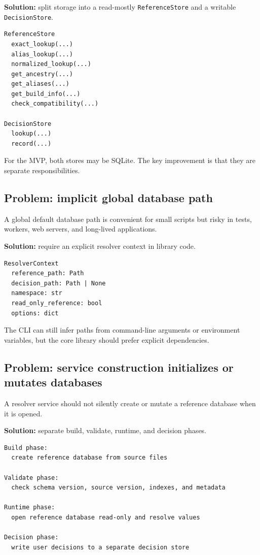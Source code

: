 \documentclass[11pt,a4paper]{article}
\newcommand{\code}[1]{\texttt{#1}}
\begin{document}
\textbf{Solution:} split storage into a read-mostly \code{ReferenceStore} and a writable \code{DecisionStore}.

\begin{Verbatim}[fontsize=\small]
ReferenceStore
  exact_lookup(...)
  alias_lookup(...)
  normalized_lookup(...)
  get_ancestry(...)
  get_aliases(...)
  get_build_info(...)
  check_compatibility(...)

DecisionStore
  lookup(...)
  record(...)
\end{Verbatim}

For the MVP, both stores may be SQLite. The key improvement is that they are separate responsibilities.

\subsection{Problem: implicit global database path}

A global default database path is convenient for small scripts but risky in tests, workers, web servers, and long-lived applications.

\textbf{Solution:} require an explicit resolver context in library code.

\begin{Verbatim}[fontsize=\small]
ResolverContext
  reference_path: Path
  decision_path: Path | None
  namespace: str
  read_only_reference: bool
  options: dict
\end{Verbatim}

The CLI can still infer paths from command-line arguments or environment variables, but the core library should prefer explicit dependencies.

\subsection{Problem: service construction initializes or mutates databases}

A resolver service should not silently create or mutate a reference database when it is opened.

\textbf{Solution:} separate build, validate, runtime, and decision phases.

\begin{Verbatim}[fontsize=\small]
Build phase:
  create reference database from source files

Validate phase:
  check schema version, source version, indexes, and metadata

Runtime phase:
  open reference database read-only and resolve values

Decision phase:
  write user decisions to a separate decision store
\end{Verbatim}
\end{document}
